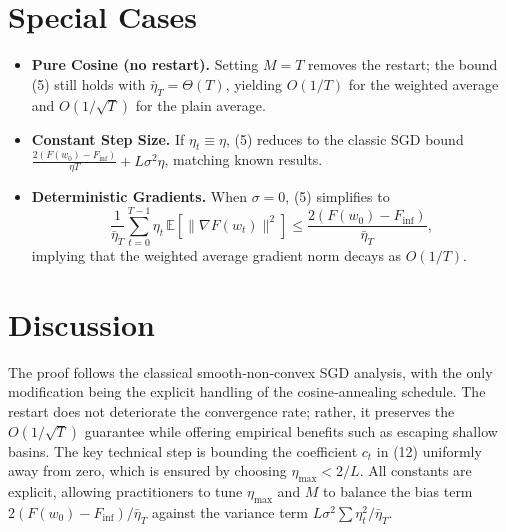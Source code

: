 \documentclass{article}
\newcommand{\E}{\mathbb{E}}
\begin{document}
\section*{Special Cases}
\begin{itemize}[leftmargin=*]
\item \textbf{Pure Cosine (no restart).} Setting $M=T$ removes the restart; the bound (5) still holds with $\bar\eta_T=\Theta(T)$, yielding $O(1/T)$ for the weighted average and $O(1/\sqrt{T})$ for the plain average.
\item \textbf{Constant Step Size.} If $\eta_t\equiv\eta$, (5) reduces to the classic SGD bound $\frac{2(F(w_0)-F_{\inf})}{\eta T}+L\sigma^{2}\eta$, matching known results.
\item \textbf{Deterministic Gradients.} When $\sigma=0$, (5) simplifies to
\[
\frac{1}{\bar\eta_T}\sum_{t=0}^{T-1}\eta_t\,\E[\|\nabla F(w_t)\|^{2}]
\le \frac{2(F(w_0)-F_{\inf})}{\bar\eta_T},
\]
implying that the weighted average gradient norm decays as $O(1/T)$.
\end{itemize}

\section*{Discussion}
The proof follows the classical smooth‑non‑convex SGD analysis, with the only modification being the explicit handling of the cosine‑annealing schedule. The restart does not deteriorate the convergence rate; rather, it preserves the $O(1/\sqrt{T})$ guarantee while offering empirical benefits such as escaping shallow basins. The key technical step is bounding the coefficient $c_t$ in (12) uniformly away from zero, which is ensured by choosing $\eta_{\max}<2/L$. All constants are explicit, allowing practitioners to tune $\eta_{\max}$ and $M$ to balance the bias term $2(F(w_0)-F_{\inf})/\bar\eta_T$ against the variance term $L\sigma^{2}\sum\eta_t^{2}/\bar\eta_T$.
\end{document}

